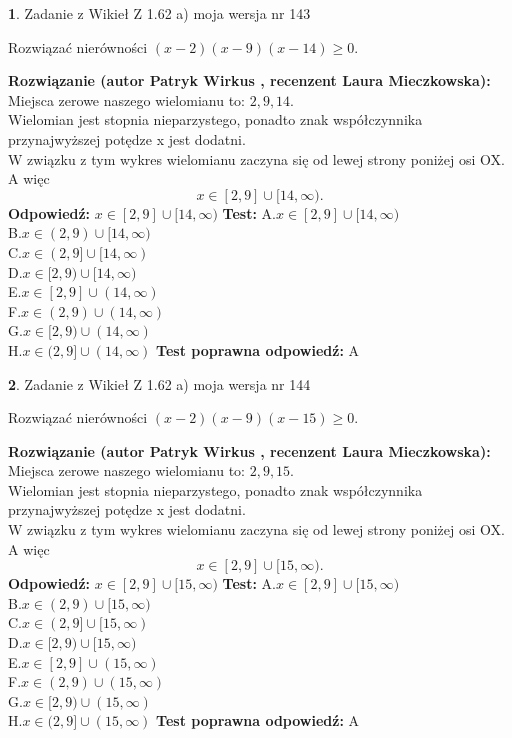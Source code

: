 \documentclass[12pt, a4paper]{article}
\theoremstyle{definition} %
\newtheorem{zad}{}
\newcommand{\zadStart}[1]{\begin{zad}#1\newline}
\newcommand{\zadStop}{\end{zad}}
\newcommand{\rozwStart}[2]{\noindent \textbf{Rozwiązanie (autor #1 , recenzent #2): }\newline}
\newcommand{\rozwStop}{\newline}
\newcommand{\odpStart}{\noindent \textbf{Odpowiedź:}\newline}
\newcommand{\odpStop}{\newline}
\newcommand{\testStart}{\noindent \textbf{Test:}\newline}
\newcommand{\testStop}{\newline}
\newcommand{\kluczStart}{\noindent \textbf{Test poprawna odpowiedź:}\newline}
\newcommand{\kluczStop}{\newline}
\begin{document}
\zadStart{Zadanie z Wikieł Z 1.62 a) moja wersja nr 143}

Rozwiązać nierówności $(x-2)(x-9)(x-14)\ge0$.
\zadStop
\rozwStart{Patryk Wirkus}{Laura Mieczkowska}
Miejsca zerowe naszego wielomianu to: $2, 9, 14$.\\
Wielomian jest stopnia nieparzystego, ponadto znak współczynnika przy\linebreak najwyższej potędze x jest dodatni.\\ W związku z tym wykres wielomianu zaczyna się od lewej strony poniżej osi OX. A więc $$x \in [2,9] \cup [14,\infty).$$
\rozwStop
\odpStart
$x \in [2,9] \cup [14,\infty)$
\odpStop
\testStart
A.$x \in [2,9] \cup [14,\infty)$\\
B.$x \in (2,9) \cup [14,\infty)$\\
C.$x \in (2,9] \cup [14,\infty)$\\
D.$x \in [2,9) \cup [14,\infty)$\\
E.$x \in [2,9] \cup (14,\infty)$\\
F.$x \in (2,9) \cup (14,\infty)$\\
G.$x \in [2,9) \cup (14,\infty)$\\
H.$x \in (2,9] \cup (14,\infty)$
\testStop
\kluczStart
A
\kluczStop



\zadStart{Zadanie z Wikieł Z 1.62 a) moja wersja nr 144}

Rozwiązać nierówności $(x-2)(x-9)(x-15)\ge0$.
\zadStop
\rozwStart{Patryk Wirkus}{Laura Mieczkowska}
Miejsca zerowe naszego wielomianu to: $2, 9, 15$.\\
Wielomian jest stopnia nieparzystego, ponadto znak współczynnika przy\linebreak najwyższej potędze x jest dodatni.\\ W związku z tym wykres wielomianu zaczyna się od lewej strony poniżej osi OX. A więc $$x \in [2,9] \cup [15,\infty).$$
\rozwStop
\odpStart
$x \in [2,9] \cup [15,\infty)$
\odpStop
\testStart
A.$x \in [2,9] \cup [15,\infty)$\\
B.$x \in (2,9) \cup [15,\infty)$\\
C.$x \in (2,9] \cup [15,\infty)$\\
D.$x \in [2,9) \cup [15,\infty)$\\
E.$x \in [2,9] \cup (15,\infty)$\\
F.$x \in (2,9) \cup (15,\infty)$\\
G.$x \in [2,9) \cup (15,\infty)$\\
H.$x \in (2,9] \cup (15,\infty)$
\testStop
\kluczStart
A
\kluczStop
\end{document}
